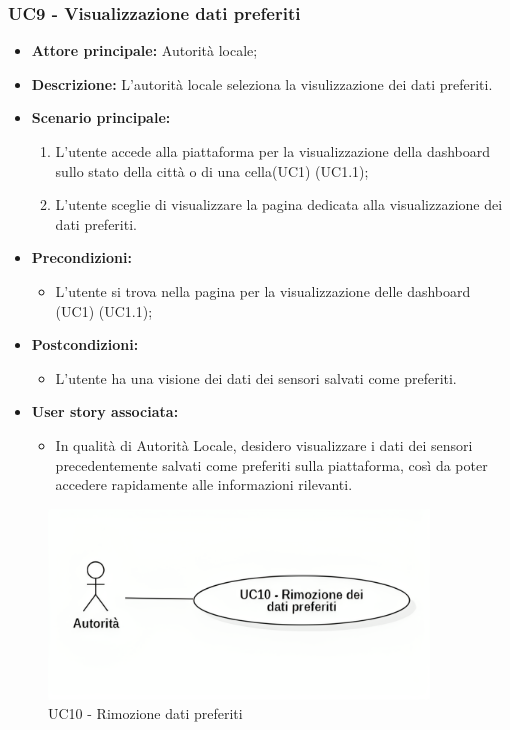 \documentclass{article}
\begin{document}
\subsubsection{UC9 - Visualizzazione dati preferiti}
\begin{itemize}
    \item \textbf{Attore principale:} Autorità locale;
    \item \textbf{Descrizione:} L’autorità locale seleziona la visulizzazione dei dati preferiti.
    \item \textbf{Scenario principale:}
          \begin{enumerate}
              \item L'utente accede alla piattaforma per la visualizzazione della dashboard sullo stato della città o di una cella(UC1) (UC1.1);
              \item L'utente sceglie di visualizzare la pagina dedicata alla visualizzazione dei dati preferiti.
          \end{enumerate}
    \item \textbf{Precondizioni:}
          \begin{itemize}
              \item  L'utente si trova nella pagina per la visualizzazione delle dashboard (UC1) (UC1.1);
          \end{itemize}
    \item \textbf{Postcondizioni:}
          \begin{itemize}
              \item  L'utente ha una visione dei dati dei sensori salvati come preferiti.
          \end{itemize}
    \item \textbf{User story associata:}
          \begin{itemize}
              \item In qualità di Autorità Locale, desidero visualizzare i dati dei sensori precedentemente salvati come preferiti sulla piattaforma, così da poter accedere rapidamente alle informazioni rilevanti.
          \end{itemize}
\end{itemize}


\begin{figure}[H]
    \centering
    \includegraphics[width=0.9\textwidth]{Images/uc10.png}
    \caption{UC10 - Rimozione dati preferiti}
    \label{fig:UC10}
\end{figure}
\end{document}
